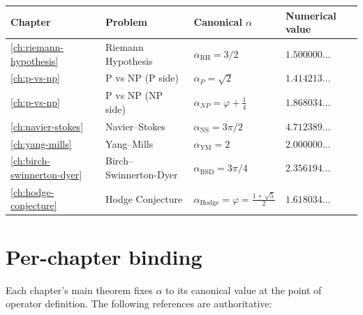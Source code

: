 \renewcommand{\arraystretch}{1.3}
\begin{center}
\begin{tabular}{@{}llll@{}}
\toprule
\textbf{Chapter} & \textbf{Problem} & \textbf{Canonical $\alpha$} & \textbf{Numerical value} \\
\midrule
\ref{ch:riemann-hypothesis} & Riemann Hypothesis & $\alpha_{\mathrm{RH}} = 3/2$ & $1.500000\ldots$ \\
\ref{ch:p-vs-np} & P vs NP (P side) & $\alpha_P = \sqrt{2}$ & $1.414213\ldots$ \\
\ref{ch:p-vs-np} & P vs NP (NP side) & $\alpha_{NP} = \varphi + \tfrac{1}{4}$ & $1.868034\ldots$ \\
\ref{ch:navier-stokes} & Navier--Stokes & $\alpha_{\mathrm{NS}} = 3\pi/2$ & $4.712389\ldots$ \\
\ref{ch:yang-mills} & Yang--Mills & $\alpha_{\mathrm{YM}} = 2$ & $2.000000\ldots$ \\
\ref{ch:birch-swinnerton-dyer} & Birch--Swinnerton-Dyer & $\alpha_{\mathrm{BSD}} = 3\pi/4$ & $2.356194\ldots$ \\
\ref{ch:hodge-conjecture} & Hodge Conjecture & $\alpha_{\mathrm{Hodge}} = \varphi = \tfrac{1+\sqrt 5}{2}$ & $1.618034\ldots$ \\
\bottomrule
\end{tabular}
\end{center}

\section*{Per-chapter binding}

Each chapter's main theorem fixes $\alpha$ to its canonical value at the point of operator definition. The following references are authoritative:

